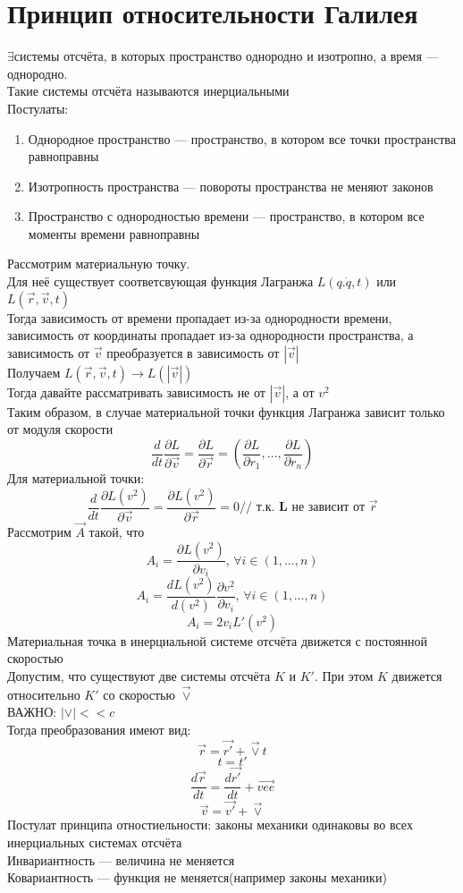 \documentclass[a4paper, 12pt, titlepage, fleqn]{article}
\newcommand{\T}{\textbf}
\newcommand{\D}{\partial}
\newcommand{\Indexes}{\T{, }\forall i \in (1, \dots, n)}
\begin{document}
	\section{Принцип относительности Галилея}
		$\exists$системы отсчёта, в которых пространство однородно и изотропно, а время --- однородно. \\
		Такие системы отсчёта называются инерциальными\\
		Постулаты:
			\begin{enumerate}
				\item Однородное пространство --- пространство, в котором все точки пространства равноправны 
				\item Изотропность пространства --- повороты пространства не меняют законов
				\item Пространство с однородностью времени --- пространство, в котором все моменты времени равноправны
			\end{enumerate}
		Рассмотрим материальную точку.\\
		Для неё существует соответсвующая функция Лагранжа $L(q. \dot{q}, t)$ или $L(\vec{r}, \vec{v}, t)$\\
		Тогда зависимость от времени пропадает из-за однородности времени, зависимость от координаты пропадает из-за однородности пространства, а  зависимость от $\vec{v}$ преобразуется в зависимость от $|\vec{v}|$\\
		Получаем $L(\vec{r}, \vec{v}, t) \to L(|\vec{v}|)$\\
		Тогда давайте рассматривать зависимость не от $|\vec{v}|$, а от $v^2$\\
		Таким образом, в случае материальной точки функция Лагранжа зависит только от модуля скорости
		\[
			\frac{d}{dt}\frac{\D L}{\D \vec{v}} = \frac{\D L}{\D \vec{r}} = (\frac{\D L}{\D r_1}, \dots, \frac{\D L}{\D r_n})
		\]
		Для материальной точки:
		\[
			\frac{d}{dt}\frac{\D L(v^2)}{\D \vec{v}} = \frac{\D L(v^2)}{\D \vec{r}} = 0 // \T{ т.к. L не зависит от } \vec{r} 
		\]
		Рассмотрим $\vec{A}$ такой, что 
		\[
			A_i = \frac{\D L(v^2)}{\D v_i} \Indexes
		\]
		\[
			A_i = \frac{dL(v^2)}{d(v^2)}\frac{\D v^2}{\D v_i} \Indexes
		\]
		\[
			A_i = 2v_iL'(v^2) 
		\]
		Материальная точка в инерциальной системе отсчёта движется с постоянной скоростью\\
		
		Допустим, что существуют две системы отсчёта $K$ и $K'$. При этом $K$ движется относительно $K'$ со скоростью $\vec{\vee}$\\
		ВАЖНО: $|\vee| < < c$\\
		Тогда преобразования имеют вид:
		\[
			\vec{r} = \vec{r'} + \vec{\vee}t
		\] 
		\[
			t = t'
		\]
		\[
			\frac{d\vec{r}}{dt} = \frac{d\vec{r'}}{dt} + \vec{vee}
		\]
		\[
			\vec{v} = \vec{v'} + \vec{\vee}
		\]
		Постулат принципа отностиельности: законы механики одинаковы во всех инерциальных системах отсчёта\\
		Инвариантность --- величина не меняется\\
		Ковариантность --- функция не меняется(например законы механики)\\
\end{document}
